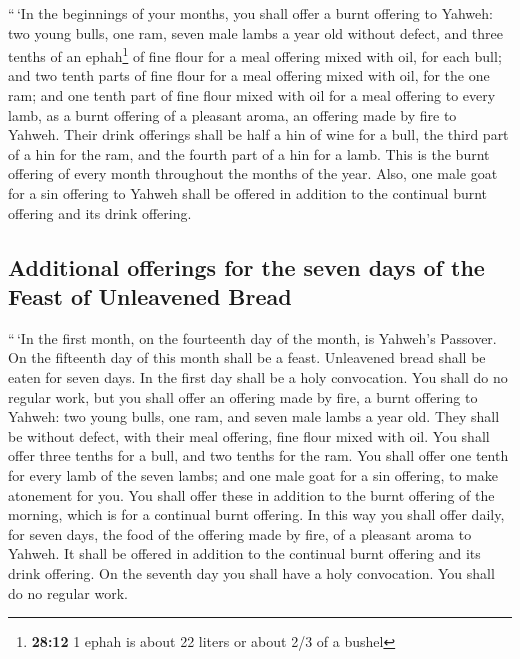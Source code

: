  ``\,`In the beginnings of your months, you shall offer a
burnt offering to Yahweh: two young bulls, one ram, seven male lambs a
year old without defect,  and three tenths of an
ephah\footnote{\textbf{28:12} 1 ephah is about 22 liters or about 2/3 of
  a bushel} of fine flour for a meal offering mixed with oil, for each
bull; and two tenth parts of fine flour for a meal offering mixed with
oil, for the one ram;  and one tenth part of fine flour
mixed with oil for a meal offering to every lamb, as a burnt offering of
a pleasant aroma, an offering made by fire to Yahweh. 
Their drink offerings shall be half a hin of wine for a bull, the third
part of a hin for the ram, and the fourth part of a hin for a lamb. This
is the burnt offering of every month throughout the months of the year.
 Also, one male goat for a sin offering to Yahweh shall
be offered in addition to the continual burnt offering and its drink
offering.

\hypertarget{additional-offerings-for-the-seven-days-of-the-feast-of-unleavened-bread}{%
\subsection{Additional offerings for the seven days of the Feast of
Unleavened
Bread}\label{additional-offerings-for-the-seven-days-of-the-feast-of-unleavened-bread}}

 ``\,`In the first month, on the fourteenth day of the
month, is Yahweh's Passover.  On the fifteenth day of
this month shall be a feast. Unleavened bread shall be eaten for seven
days.  In the first day shall be a holy convocation. You
shall do no regular work,  but you shall offer an
offering made by fire, a burnt offering to Yahweh: two young bulls, one
ram, and seven male lambs a year old. They shall be without defect,
 with their meal offering, fine flour mixed with oil. You
shall offer three tenths for a bull, and two tenths for the ram.
 You shall offer one tenth for every lamb of the seven
lambs;  and one male goat for a sin offering, to make
atonement for you.  You shall offer these in addition to
the burnt offering of the morning, which is for a continual burnt
offering.  In this way you shall offer daily, for seven
days, the food of the offering made by fire, of a pleasant aroma to
Yahweh. It shall be offered in addition to the continual burnt offering
and its drink offering.  On the seventh day you shall
have a holy convocation. You shall do no regular work.

